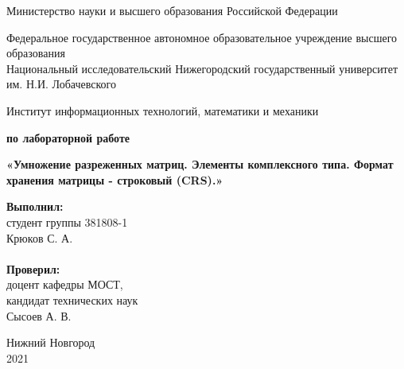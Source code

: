 \documentclass{report}
\begin{document}
\begin{titlepage}

\begin{center}
Министерство науки и высшего образования Российской Федерации
\end{center}

\begin{center}
Федеральное государственное автономное образовательное учреждение высшего образования \\
Национальный исследовательский Нижегородский государственный университет им. Н.И. Лобачевского
\end{center}

\begin{center}
Институт информационных технологий, математики и механики
\end{center}

\vspace{4em}

\begin{center}
\textbf{ по лабораторной работе} \\
\end{center}
\begin{center}
\textbf{\Large«Умножение разреженных матриц. Элементы комплексного типа. Формат хранения матрицы - строковый (CRS).»} \\
\end{center}

\vspace{4em}

\newbox{\lbox}
\newlength{\maxl}
\setlength{\maxl}{\wd\lbox}
\hfill\parbox{7cm}{
\hspace*{5cm}\hspace*{-5cm}\textbf{Выполнил:} \\ студент группы 381808-1 \\ Крюков С. А.\\
\\
\hspace*{5cm}\hspace*{-5cm}\textbf{Проверил:}\\ доцент кафедры МОСТ, \\ кандидат технических наук \\ Сысоев А. В.\\
}
\vspace{\fill}

\begin{center} Нижний Новгород \\ 2021 \end{center}

\end{titlepage}
\end{document}
